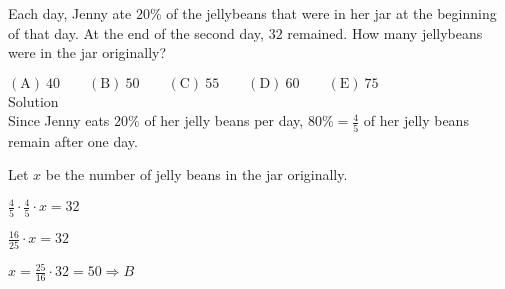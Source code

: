 
Each day, Jenny ate $20\%$ of the jellybeans that were in her jar at the beginning of that day. At the end of the second day, $32$ remained. How many jellybeans were in the jar originally?

$\mathrm{(A) \ 40 } \qquad \mathrm{(B) \ 50 } \qquad \mathrm{(C) \ 55 } \qquad \mathrm{(D) \ 60 } \qquad \mathrm{(E) \ 75 }$
\\
Solution
\\
Since Jenny eats $20\%$ of her jelly beans per day, $80\%=\frac{4}{5}$ of her jelly beans remain after one day.

Let $x$ be the number of jelly beans in the jar originally.

$\frac{4}{5}\cdot\frac{4}{5}\cdot x=32$

$\frac{16}{25}\cdot x=32$

$x=\frac{25}{16}\cdot32= 50 \Rightarrow \boxed{B}$

